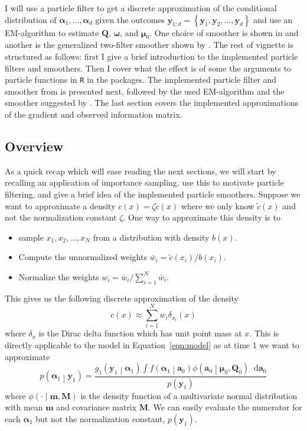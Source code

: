 \documentclass[notitlepage]{article}
\renewcommand{\vec}[1]{\bm{#1}}
\newcommand{\mat}[1]{\mathbf{#1}}
\newcommand{\Lbrace}[1]{\left\{ #1\right\}}
\newcommand{\Lparen}[1]{\left( #1\right)}
\newcommand{\Cond}[2]{ #1 \middle\vert  #2}
\newcommand*\diff{\mathop{}\!\mathrm{d}}
\newcommand{\optor}[2]{#1\Lparen{#2}}
\newcommand{\optorC}[3]{\optor{#1}{\Cond{#2}{#3}}}
\newcommand{\pdens}[1]{\optor{p}{#1}}
\newcommand{\pdensC}[2]{\optorC{p}{#1}{#2}}
\newcommand{\normaldC}[3]{\optorC{\phi}{#1}{#2,#3}}
\newcommand\dirac[2]{\optor{\delta_{#1}}{#2}}
\newcommand{\nPart}{N}
\newcommand{\nPeriods}{d}
\begin{document}
I will use a particle filter to get a discrete approximation of
the conditional distribution of 
$\vec{\alpha}_1, \dots, \vec{\alpha}_\nPeriods$ given the outcomes 
$\vec{y}_{1:\nPeriods} = \Lbrace{\vec{y}_1,\vec{y}_2,\dots, \vec{y}_\nPeriods}$ and use 
an EM-algorithm to estimate $\mat{Q}$, $\vec\omega$, and $\vec\mu_0$. One choice of smoother is 
shown in \cite{fearnhead10} and another is the generalized two-filter smoother shown by \cite{briers09}. 
The rest of
vignette is structured as follows: first I give a brief introduction to the implemented particle
filters and smoothers. Then I cover what the effect is of some the arguments to 
particle functions in \texttt{R} in the packages. 
The implemented particle filter and smoother from \cite{fearnhead10} is presented next, followed by 
the used EM-algorithm and the smoother suggested by \cite{briers09}.
The last section covers the implemented approximations of the gradient and
observed information matrix. 
  
\subsection{Overview}
As a quick recap which will ease reading the next sections, we will start by 
recalling an application of importance sampling, use this to motivate particle filtering, 
and give a brief idea of the implemented particle smoothers. 
Suppose we want to approximate a
density $c(x) = \zeta\tilde c(x)$ where we only know $\tilde c(x)$ and not 
the normalization constant $\zeta$. One way to approximate this density is 
to %
%
\begin{itemize}
  \item sample $x_1,x_2,\dots,x_\nPart$ from a distribution with density $b(x)$.
  \item Compute the unnormalized weights $\bar w_i = \tilde c(x_i) / b(x_i)$.
  \item Normalize the weights $w_i = \bar w_i / \sum_{i = 1}^\nPart\bar w_i$. 
\end{itemize}%
%
This gives us the following discrete approximation of the density %
%
$$c(x) \approx \sum_{i = 1}^\nPart w_i\dirac{x_i}{x}$$%
% 
where $\delta_{x}$ is the Dirac delta function which has unit point mass
at $x$. This is directly applicable to the model
in Equation~\eqref{eqn:model} as at time 1 we want to approximate %
%
$$
\pdensC{\vec\alpha_1}{\vec y_1} = \frac{
	\optorC{g_1}{\vec y_1}{\vec\alpha_1} 
	\int\optorC{f}{\vec\alpha_1}{\vec a_0}
	\normaldC{\vec a_0}{\vec\mu_0}{\mat Q_0}\diff\vec a_0
	}{\pdens{\vec y_1}}
$$%
%
where $\normaldC{\cdot}{\vec m}{\mat M}$ is the density function of a multivariate normal 
distribution with mean $\vec m$ and covariance matrix $\mat M$. We can easily evaluate the 
numerator for each $\vec\alpha_1$ but not the normalization constant, $\pdens{\vec y_1}$. 
\end{document}
